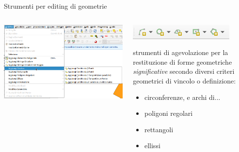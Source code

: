 \documentclass{beamer}
\begin{document}
{\begin{frame}
\end{frame}

\begin{frame}{Strumenti per editing di geometrie}
    \begin{columns}
        \begin{column}{.5\textwidth}
            \includegraphics[width=\textwidth] {digitizing_pics/Aggiungi elementi geometrici del 2022-10-11 15-47-01.png}
        \end{column}
        \begin{column}{.5\textwidth}
            \begin{center}
                \includegraphics[width=.5\textwidth] {pics/forme.PNG}
            \end{center}
            strumenti di agevolazione per la restituzione di forme geometriche \emph{significative} secondo diversi criteri geometrici di vincolo o definizione:
            \begin{itemize}
                \item circonferenze, e archi di...
                \item poligoni regolari
                \item rettangoli
                \item ellissi
            \end{itemize}
        \end{column}
    \end{columns}
\end{frame}

	 	
}
\end{document}

